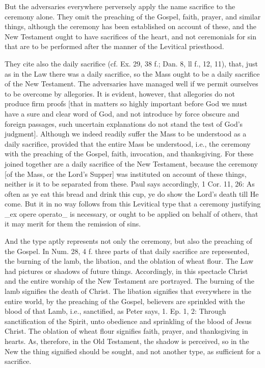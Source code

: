 But the adversaries everywhere perversely apply the name sacrifice to
the ceremony alone.  They omit the preaching of the Gospel, faith,
prayer, and similar things, although the ceremony has been
established on account of these, and the New Testament ought to have
sacrifices of the heart, and not ceremonials for sin that are to be
performed after the manner of the Levitical priesthood.

They cite also the daily sacrifice (cf.  Ex. 29, 38 f.; Dan. 8, ll f.,
12, 11), that, just as in the Law there was a daily sacrifice, so
the Mass ought to be a daily sacrifice of the New Testament.  The
adversaries have managed well if we permit ourselves to be overcome
by allegories.  It is evident, however, that allegories do not
produce firm proofs [that in matters so highly important before God
we must have a sure and clear word of God, and not introduce by force
obscure and foreign passages, such uncertain explanations do not
stand the test of God's judgment].  Although we indeed readily suffer
the Mass to be understood as a daily sacrifice, provided that the
entire Mass be understood, i.e., the ceremony with the preaching of
the Gospel, faith, invocation, and thanksgiving.  For these joined
together are a daily sacrifice of the New Testament, because the
ceremony [of the Mass, or the Lord's Supper] was instituted on
account of these things, neither is it to be separated from these.
Paul says accordingly, 1 Cor. 11, 26: As often as ye eat this bread
and drink this cup, ye do show the Lord's death till He come.  But it
in no way follows from this Levitical type that a ceremony justifying
_ex opere operato_ is necessary, or ought to be applied on behalf of
others, that it may merit for them the remission of sins.

And the type aptly represents not only the ceremony, but also the
preaching of the Gospel.  In Num. 28, 4 f. three parts of that daily
sacrifice are represented, the burning of the lamb, the libation, and
the oblation of wheat flour.  The Law had pictures or shadows of
future things.  Accordingly, in this spectacle Christ and the entire
worship of the New Testament are portrayed.  The burning of the lamb
signifies the death of Christ.  The libation signifies that
everywhere in the entire world, by the preaching of the Gospel,
believers are sprinkled with the blood of that Lamb, i.e., sanctified,
as Peter says, 1. Ep. 1, 2: Through sanctification of the Spirit,
unto obedience and sprinkling of the blood of Jesus Christ.  The
oblation of wheat flour signifies faith, prayer, and thanksgiving in
hearts.  As, therefore, in the Old Testament, the shadow is perceived,
so in the New the thing signified should be sought, and not another
type, as sufficient for a sacrifice.

